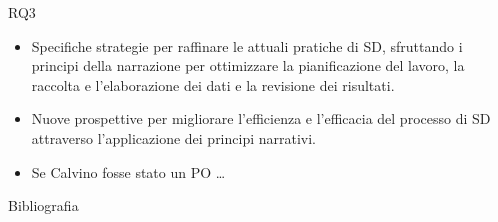 \documentclass{beamer}
\begin{document}
\begin{frame}[t]{\centerline{RQ3}}
  \begin{itemize}
\item Specifiche strategie per raffinare le attuali pratiche di SD, sfruttando i principi della narrazione per ottimizzare la pianificazione del lavoro, la raccolta e l'elaborazione dei dati e la revisione dei risultati. \item Nuove prospettive per migliorare l'efficienza e l'efficacia del processo di SD attraverso l'applicazione dei principi narrativi.
\item Se Calvino \cite{calvino} fosse stato un PO \ldots
  \end{itemize}
  \vspace{0.2cm}
\caption{''Il problema è capirsi. Oppure nessuno pu\'o capire nessuno: ogni merlo crede d’aver messo nel fischio un significato fondamentale per lui, ma che solo lui intende; l’altro gli ribatte qualcosa che non ha relazione con quello che lui ha detto; è un dialogo tra sordi, una conversazione senza né capo né coda. Ma i dialoghi umani sono forse qualcosa di diverso?''}
\citeauthor{Calvino83} \citeyear{Calvino83}
\end{frame}

\vspace{-\baselineskip}
\tiny
\begin{frame}[height=0.5]{\centerline{Bibliografia}}
\begin{minipage}{\textwidth}
\setlength{\bibsep}{0pt}


\end{minipage}
\end{frame}
\end{document}
